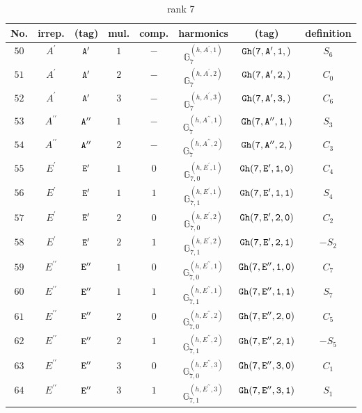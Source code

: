 \documentclass[fleqn,8pt]{jsarticle}
\begin{document}
\begin{table}[ht!]
\begin{center}
\caption{rank 7}
\renewcommand{\arraystretch}{1.3}
\begin{tabular}{cccccccc} \hline \hline
No. & irrep. & (tag) & mul. & comp. & harmonics & (tag) & definition \\ \hline
$ 50 $ & $ A^{\prime} $ & $ {\tt A'} $ & $ 1 $ & $ - $ & $ \mathbb{G}_{7}^{(h,A^{\prime},1)} $ & $ {\tt Gh(7,A',1,)} $ & $ S_{6} $ \\
$ 51 $ & $ A^{\prime} $ & $ {\tt A'} $ & $ 2 $ & $ - $ & $ \mathbb{G}_{7}^{(h,A^{\prime},2)} $ & $ {\tt Gh(7,A',2,)} $ & $ C_{0} $ \\
$ 52 $ & $ A^{\prime} $ & $ {\tt A'} $ & $ 3 $ & $ - $ & $ \mathbb{G}_{7}^{(h,A^{\prime},3)} $ & $ {\tt Gh(7,A',3,)} $ & $ C_{6} $ \\
$ 53 $ & $ A^{\prime\prime} $ & $ {\tt A''} $ & $ 1 $ & $ - $ & $ \mathbb{G}_{7}^{(h,A^{\prime\prime},1)} $ & $ {\tt Gh(7,A'',1,)} $ & $ S_{3} $ \\
$ 54 $ & $ A^{\prime\prime} $ & $ {\tt A''} $ & $ 2 $ & $ - $ & $ \mathbb{G}_{7}^{(h,A^{\prime\prime},2)} $ & $ {\tt Gh(7,A'',2,)} $ & $ C_{3} $ \\
$ 55 $ & $ E^{\prime} $ & $ {\tt E'} $ & $ 1 $ & $ 0 $ & $ \mathbb{G}_{7,0}^{(h,E^{\prime},1)} $ & $ {\tt Gh(7,E',1,0)} $ & $ C_{4} $ \\
$ 56 $ & $ E^{\prime} $ & $ {\tt E'} $ & $ 1 $ & $ 1 $ & $ \mathbb{G}_{7,1}^{(h,E^{\prime},1)} $ & $ {\tt Gh(7,E',1,1)} $ & $ S_{4} $ \\
$ 57 $ & $ E^{\prime} $ & $ {\tt E'} $ & $ 2 $ & $ 0 $ & $ \mathbb{G}_{7,0}^{(h,E^{\prime},2)} $ & $ {\tt Gh(7,E',2,0)} $ & $ C_{2} $ \\
$ 58 $ & $ E^{\prime} $ & $ {\tt E'} $ & $ 2 $ & $ 1 $ & $ \mathbb{G}_{7,1}^{(h,E^{\prime},2)} $ & $ {\tt Gh(7,E',2,1)} $ & $ - S_{2} $ \\
$ 59 $ & $ E^{\prime\prime} $ & $ {\tt E''} $ & $ 1 $ & $ 0 $ & $ \mathbb{G}_{7,0}^{(h,E^{\prime\prime},1)} $ & $ {\tt Gh(7,E'',1,0)} $ & $ C_{7} $ \\
$ 60 $ & $ E^{\prime\prime} $ & $ {\tt E''} $ & $ 1 $ & $ 1 $ & $ \mathbb{G}_{7,1}^{(h,E^{\prime\prime},1)} $ & $ {\tt Gh(7,E'',1,1)} $ & $ S_{7} $ \\
$ 61 $ & $ E^{\prime\prime} $ & $ {\tt E''} $ & $ 2 $ & $ 0 $ & $ \mathbb{G}_{7,0}^{(h,E^{\prime\prime},2)} $ & $ {\tt Gh(7,E'',2,0)} $ & $ C_{5} $ \\
$ 62 $ & $ E^{\prime\prime} $ & $ {\tt E''} $ & $ 2 $ & $ 1 $ & $ \mathbb{G}_{7,1}^{(h,E^{\prime\prime},2)} $ & $ {\tt Gh(7,E'',2,1)} $ & $ - S_{5} $ \\
$ 63 $ & $ E^{\prime\prime} $ & $ {\tt E''} $ & $ 3 $ & $ 0 $ & $ \mathbb{G}_{7,0}^{(h,E^{\prime\prime},3)} $ & $ {\tt Gh(7,E'',3,0)} $ & $ C_{1} $ \\
$ 64 $ & $ E^{\prime\prime} $ & $ {\tt E''} $ & $ 3 $ & $ 1 $ & $ \mathbb{G}_{7,1}^{(h,E^{\prime\prime},3)} $ & $ {\tt Gh(7,E'',3,1)} $ & $ S_{1} $ \\
 \hline \hline
\end{tabular}
\end{center}
\end{table}
\end{document}
